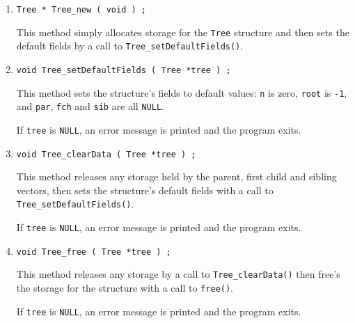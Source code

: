 \begin{enumerate}
\item
\begin{verbatim}
Tree * Tree_new ( void ) ;
\end{verbatim}
This method simply allocates storage for the {\tt Tree} structure 
and then sets the default fields by a call to 
{\tt Tree\_setDefaultFields()}.
\item
\begin{verbatim}
void Tree_setDefaultFields ( Tree *tree ) ;
\end{verbatim}
This method sets the structure's fields to default values:
{\tt n} is zero, {\tt root} is {\tt -1}, and {\tt par}, {\tt fch}
and {\tt sib} are all {\tt NULL}.
\par {}
If {\tt tree} is {\tt NULL},
an error message is printed and the program exits.
\item
\begin{verbatim}
void Tree_clearData ( Tree *tree ) ;
\end{verbatim}
This method releases any storage held by the parent, first child
and sibling vectors, then sets the structure's default fields 
with a call to {\tt Tree\_setDefaultFields()}.
\par {}
If {\tt tree} is {\tt NULL},
an error message is printed and the program exits.
\item
\begin{verbatim}
void Tree_free ( Tree *tree ) ;
\end{verbatim}
This method releases any storage by a call to 
{\tt Tree\_clearData()} then free's the storage for the 
structure with a call to {\tt free()}.
\par {}
If {\tt tree} is {\tt NULL},
an error message is printed and the program exits.
\end{enumerate}
\par
